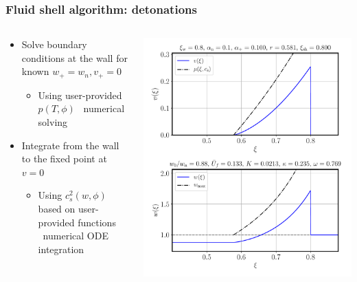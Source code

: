 \begin{frame}
    \frametitle{Fluid shell algorithm: detonations}
    \begin{columns}
    \begin{column}{0.6\textwidth}
        \begin{itemize}
            \item Solve boundary conditions at the wall for known $w_+=w_n, v_+=0$
            \begin{itemize}
                \item Using user-provided $p(T,\phi)$ \textrightarrow \ numerical solving
            \end{itemize}
            \item Integrate from the wall to the fixed point at $v=0$
            \begin{itemize}
                \item Using $c_s^2(w,\phi)$ based on user-provided functions \textrightarrow \ numerical ODE integration
            \end{itemize}
        \end{itemize}
    \end{column}
    \begin{column}{0.4\textwidth}
        \includegraphics[width=\textwidth]{../fig/lecture_notes/shell_plot_vw_08_alphan_01_review}
    \end{column}
    \end{columns}
\end{frame}

